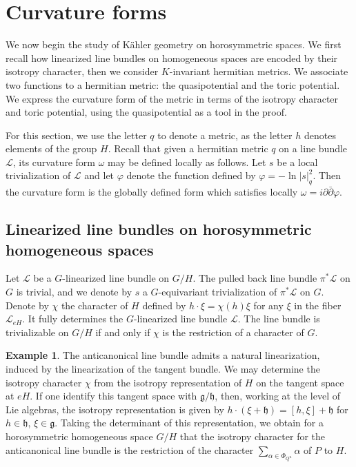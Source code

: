 \documentclass{amsart}
\theoremstyle{definition}
\newtheorem{exa}[thm]{Example}
\begin{document}
\section{Curvature forms}

\label{sec_curvature}

We now begin the study of Kähler geometry on horosymmetric spaces. We first 
recall how linearized line bundles on homogeneous spaces are encoded 
by their isotropy character, then we consider $K$-invariant hermitian 
metrics. We associate two functions to a hermitian metric: the quasipotential 
and the toric potential. We express the curvature form of the metric in terms 
of the isotropy character and toric potential, using the quasipotential as a tool 
in the proof. 

For this section, we use the letter $q$ to denote a metric, as the 
letter $h$ denotes elements of the group $H$.
Recall that given a hermitian metric $q$ on a line bundle $\mathcal{L}$, its 
curvature form $\omega$ may be defined locally as follows. Let $s$ be a local 
trivialization of $\mathcal{L}$ and let $\varphi$ denote the function defined 
by $\varphi=-\ln|s|^2_q$. Then the curvature form is the globally defined form 
which satisfies locally $\omega=i\partial\bar{\partial}\varphi$.

\subsection{Linearized line bundles on horosymmetric homogeneous spaces}

Let $\mathcal{L}$ be a $G$-linearized line bundle on $G/H$.  
The pulled back line bundle $\pi^*\mathcal{L}$ on $G$ is trivial, and we 
denote by $s$ a $G$-equivariant trivialization of $\pi^*\mathcal{L}$ on $G$.  
Denote by $\chi$ the character of $H$ defined by 
$h\cdot \xi = \chi(h) \xi$ for any $\xi$ in the fiber $\mathcal{L}_{eH}$. 
It fully determines the 
$G$-linearized line bundle $\mathcal{L}$.
The line bundle is trivializable on $G/H$ if and only if 
$\chi$ is the restriction 
of a character of $G$.

\begin{exa}
\label{exa_isotropy_ac}
The anticanonical line bundle admits a natural linearization, induced 
by the linearization of the tangent bundle. We may determine the 
isotropy character $\chi$ from the isotropy representation of $H$ 
on the tangent space at $eH$. If one identify this tangent space with 
$\mathfrak{g}/\mathfrak{h}$, then, working at the level of Lie algebras, 
the isotropy representation is given by 
$h\cdot (\xi+\mathfrak{h})= [h,\xi]+\mathfrak{h}$ 
for $h\in \mathfrak{h}$, $\xi\in \mathfrak{g}$.
Taking the determinant of this representation, we obtain for 
a horosymmetric homogeneous space $G/H$ that the isotropy character 
for the anticanonical line bundle is the restriction of the character 
$\sum_{\alpha\in \Phi_{Q^u}} \alpha$ of $P$ to $H$. 
\end{exa} 
\end{document}
